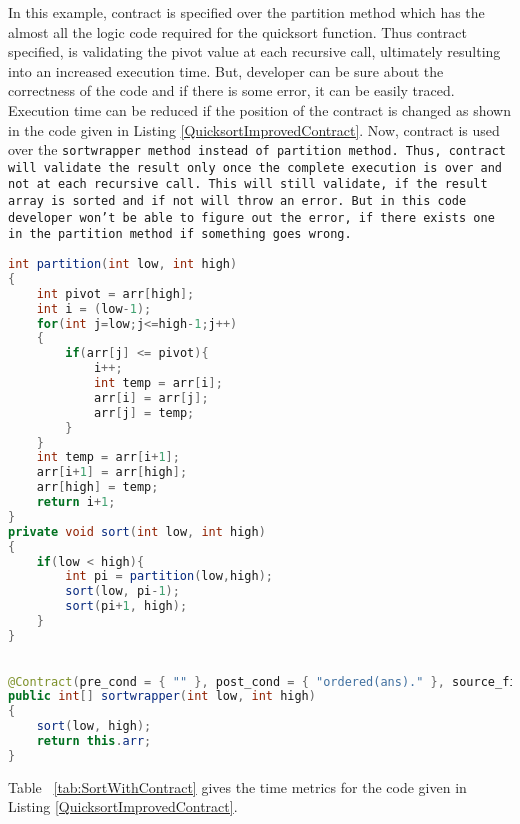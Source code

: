 In this example, contract is specified over the partition method which has the almost all the logic code required for the quicksort function. Thus contract specified, is validating the pivot value at each recursive call, ultimately resulting into an increased execution time. But, developer can be sure about the correctness of the code and if there is some error, it can be easily traced. 
Execution time can be reduced if the position of the contract is changed as shown in the code given in Listing \ref{QuicksortImprovedContract}. Now, contract is used over the \tt{sortwrapper} method instead of \tt{partition} method. Thus, contract will validate the result only once the complete execution is over and not at each recursive call. This will still validate, if the result array is sorted and if not will throw an error. But in this code developer won't be able to figure out the error, if there exists one in the partition method if something goes wrong.

\begin{minipage}{\linewidth}
\begin{lstlisting}[frame=single, language=Java, captionpos=b, breaklines=true]
int partition(int low, int high)
{
	int pivot = arr[high];
	int i = (low-1);
	for(int j=low;j<=high-1;j++)
	{
		if(arr[j] <= pivot){
			i++;
			int temp = arr[i];
			arr[i] = arr[j];
			arr[j] = temp;
		}
	}
	int temp = arr[i+1];
	arr[i+1] = arr[high];
	arr[high] = temp;
	return i+1;
}
private void sort(int low, int high)
{
	if(low < high){
		int pi = partition(low,high);
		sort(low, pi-1);
		sort(pi+1, high);
	}
}
\end{lstlisting}
\end{minipage}

\begin{minipage}{\linewidth}
\begin{lstlisting}[frame=single, language=Java, caption={Quicksort Program with Contract - 2}, label={QuicksortImprovedContract}, captionpos=b, breaklines=true]

@Contract(pre_cond = { "" }, post_cond = { "ordered(ans)." }, source_files = {"mypl.pl"})
public int[] sortwrapper(int low, int high)
{
	sort(low, high);
	return this.arr;
}

\end{lstlisting}
\end{minipage}

Table ~\ref{tab:SortWithContract} gives the time metrics for the code given in Listing \ref{QuicksortImprovedContract}.

